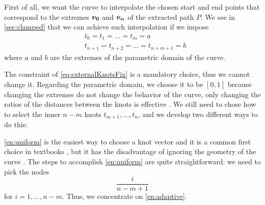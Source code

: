 \documentclass[dissertation.tex]{subfiles}
\begin{document}
First of all, we want
the curve to interpolate
the chosen start and end points that correspond to the extremes
$\boldsymbol{v_0}$ and $\boldsymbol{v_n}$ of the extracted path $P$. We see in
\cref{sec:clamped} that we can achieve such interpolation if we impose
\begin{equation}\label{eq:externalKnotsFix}
  \begin{split}
    &t_0 = t_1 = \dots = t_{m} = a\\
    &t_{n+1} = t_{n+2} = \dots = t_{n+m+1} = b
  \end{split}
\end{equation}
where $a$ and $b$ are the extremes of the parametric domain of
the curve.

The constraint of \cref{eq:externalKnotsFix} is a mandatory
choice, thus we cannot change it. Regarding the parametric domain, we
choose it to be $[0,1]$ because changing the extremes do not change
the behavior of the curve, only changing the ratios of the distances
between the knots is effective \cite{farin}. We still need to chose how to select 
the inner $n-m$ knots $t_{m+1},\dots,t_n$, and we develop two different
ways to do this:

\cref{en:uniform} is the easiest way to choose a knot vector
and it is a common first choice in textbooks \cite{farin}\cite{docarmo},
but it has the disadvantage of ignoring the geometry of the curve
\cite{farin}. The steps to accomplish \cref{en:uniform} are quite
straightforward: we need to pick the nodes
\begin{equation*}
  \frac{i}{n-m+1}
\end{equation*}
for $i=1,\dots,n-m$. Thus, we concentrate on \cref{en:adaptive}.
\end{document}
